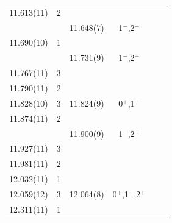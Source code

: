 \begin{center}
\begin{longtable}{cc cc cc}
     11.613(11)   & 2        &                  &                     &             &                 \\
                  &          &  11.648(7)       & 1$^-$,2$^+$         &             &                 \\
   11.690(10)     & 1        &                  &                     &             &                 \\
                  &          &  11.731(9)       & 1$^-$,2$^+$         &             &                 \\
   11.767(11)     & 3        &                  &                     &             &                 \\
   11.790(11)     & 2        &                  &                     &             &                 \\
   11.828(10)     & 3        &  11.824(9)       & 0$^+$,1$^-$         &             &                 \\
     11.874(11)   & 2        &                  &                     &             &                 \\
                  &          &  11.900(9)       & 1$^-$,2$^+$         &             &                 \\
    11.927(11)    & 3        &                  &                     &             &                 \\
    11.981(11)    & 2        &                  &                     &             &                 \\
     12.032(11)   & 1        &                  &                     &             &                 \\
     12.059(12)   & 3        &  12.064(8)       & 0$^+$,1$^-$,2$^+$   &             &                 \\
    12.311(11)    & 1        &                  &                     &             &                 \\

    \end{longtable}
\end{center}



